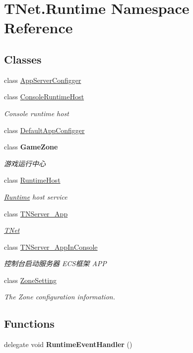 \hypertarget{namespace_t_net_1_1_runtime}{}\section{T\+Net.\+Runtime Namespace Reference}
\label{namespace_t_net_1_1_runtime}
\subsection*{Classes}
\begin{DoxyCompactItemize}
\item 
class \mbox{\hyperlink{class_t_net_1_1_runtime_1_1_app_server_configger}{App\+Server\+Configger}}
\item 
class \mbox{\hyperlink{class_t_net_1_1_runtime_1_1_console_runtime_host}{Console\+Runtime\+Host}}
\begin{DoxyCompactList}\small\item\em Console runtime host \end{DoxyCompactList}\item 
class \mbox{\hyperlink{class_t_net_1_1_runtime_1_1_default_app_configger}{Default\+App\+Configger}}
\item 
class {\bfseries Game\+Zone}
\begin{DoxyCompactList}\small\item\em 游戏运行中心 \end{DoxyCompactList}\item 
class \mbox{\hyperlink{class_t_net_1_1_runtime_1_1_runtime_host}{Runtime\+Host}}
\begin{DoxyCompactList}\small\item\em \mbox{\hyperlink{namespace_t_net_1_1_runtime}{Runtime}} host service \end{DoxyCompactList}\item 
class \mbox{\hyperlink{class_t_net_1_1_runtime_1_1_t_n_server___app}{T\+N\+Server\+\_\+\+App}}
\begin{DoxyCompactList}\small\item\em \mbox{\hyperlink{namespace_t_net}{T\+Net}} \end{DoxyCompactList}\item 
class \mbox{\hyperlink{class_t_net_1_1_runtime_1_1_t_n_server___app_in_console}{T\+N\+Server\+\_\+\+App\+In\+Console}}
\begin{DoxyCompactList}\small\item\em 控制台启动服务器 E\+C\+S框架 A\+PP \end{DoxyCompactList}\item 
class \mbox{\hyperlink{class_t_net_1_1_runtime_1_1_zone_setting}{Zone\+Setting}}
\begin{DoxyCompactList}\small\item\em The Zone configuration information. \end{DoxyCompactList}\end{DoxyCompactItemize}
\subsection*{Functions}
\begin{DoxyCompactItemize}
\item 
\mbox{\label{namespace_t_net_1_1_runtime_ab30ff54b5b7bcbcb8f568d945b0f01ad}} 
delegate void {\bfseries Runtime\+Event\+Handler} ()
\end{DoxyCompactItemize}

